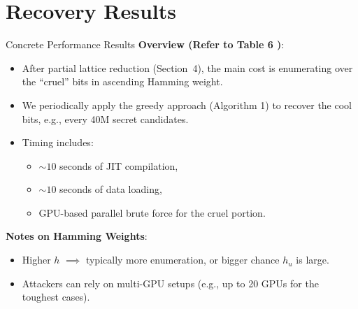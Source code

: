 \documentclass{beamer}
\begin{document}
\section{Recovery Results}
\begin{frame}{Concrete Performance Results}
  \textbf{Overview (Refer to Table 6 \cite{concrete_results})}:
  \begin{itemize}
    \item After partial lattice reduction (Section~4), the main cost is enumerating over the ``cruel'' bits in ascending Hamming weight.
    \item We periodically apply the greedy approach (Algorithm 1) to recover the cool bits, e.g., every 40M secret candidates.
    \item Timing includes:
      \begin{itemize}
        \item $\sim 10$ seconds of JIT compilation,
        \item $\sim 10$ seconds of data loading,
        \item GPU-based parallel brute force for the cruel portion.
      \end{itemize}
  \end{itemize}

  \vspace{0.3cm}
  \textbf{Notes on Hamming Weights}:
  \begin{itemize}
    \item Higher $h$ $\implies$ typically more enumeration, or bigger chance $h_u$ is large.
    \item Attackers can rely on multi-GPU setups (e.g., up to 20 GPUs for the toughest cases).
  \end{itemize}
\end{frame}
\end{document}
